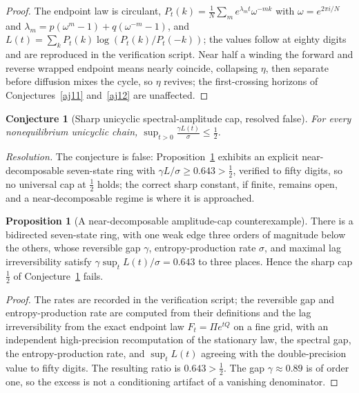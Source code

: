 \documentclass[11pt]{article}
\newtheorem{conjecture}{Conjecture}
\theoremstyle{definition}
\newtheorem{proposition}{Proposition}
\begin{document}
\begin{proof}
The endpoint law is circulant, $P_t(k)=\tfrac1N\sum_me^{\lambda_mt}\omega^{-mk}$ with $\omega=e^{2\pi i/N}$ and $\lambda_m=p(\omega^m-1)+q(\omega^{-m}-1)$, and $L(t)=\sum_kP_t(k)\log(P_t(k)/P_t(-k))$; the values follow at eighty digits and are reproduced in the verification script.  Near half a winding the forward and reverse wrapped endpoint means nearly coincide, collapsing $\eta$, then separate before diffusion mixes the cycle, so $\eta$ revives; the first-crossing horizons of Conjectures~\ref{aj11} and~\ref{aj12} are unaffected.
\end{proof}

\begin{conjecture}[Sharp unicyclic spectral-amplitude cap, resolved false]\label{aj9}
For every nonequilibrium unicyclic chain, $\displaystyle\sup_{t>0}\frac{\gamma L(t)}{\sigma}\le\frac12$.
\end{conjecture}

\emph{Resolution.} The conjecture is false: Proposition~\ref{aj:c9} exhibits an explicit near-decomposable seven-state ring with $\gamma L/\sigma\ge0.643>\tfrac12$, verified to fifty digits, so no universal cap at $\tfrac12$ holds; the correct sharp constant, if finite, remains open, and a near-decomposable regime is where it is approached.

\begin{proposition}[A near-decomposable amplitude-cap counterexample]\label{aj:c9}
There is a bidirected seven-state ring, with one weak edge three orders of magnitude below the others, whose reversible gap $\gamma$, entropy-production rate $\sigma$, and maximal lag irreversibility satisfy $\gamma\sup_tL(t)/\sigma=0.643$ to three places.  Hence the sharp cap $\tfrac12$ of Conjecture~\ref{aj9} fails.
\end{proposition}

\begin{proof}
The rates are recorded in the verification script; the reversible gap and entropy-production rate are computed from their definitions and the lag irreversibility from the exact endpoint law $F_t=\Pi e^{tQ}$ on a fine grid, with an independent high-precision recomputation of the stationary law, the spectral gap, the entropy-production rate, and $\sup_tL(t)$ agreeing with the double-precision value to fifty digits.  The resulting ratio is $0.643>\tfrac12$.  The gap $\gamma\approx0.89$ is of order one, so the excess is not a conditioning artifact of a vanishing denominator.
\end{proof}
\end{document}
